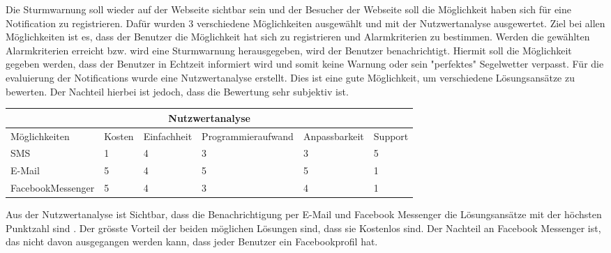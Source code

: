 Die Sturmwarnung soll wieder auf der Webseite sichtbar sein und der Besucher der Webseite soll die Möglichkeit haben sich für eine Notification zu registrieren. Dafür wurden 3 verschiedene Möglichkeiten ausgewählt und mit der Nutzwertanalyse ausgewertet. Ziel bei allen Möglichkeiten ist es, dass der Benutzer die Möglichkeit hat sich zu registrieren und Alarmkriterien zu bestimmen. Werden die gewählten Alarmkriterien erreicht bzw. wird eine Sturmwarnung herausgegeben, wird der Benutzer benachrichtigt. Hiermit soll die Möglichkeit gegeben werden, dass der Benutzer in Echtzeit informiert wird und somit keine Warnung oder sein "perfektes" Segelwetter verpasst. Für die evaluierung der Notifications wurde eine Nutzwertanalyse erstellt. Dies ist eine gute Möglichkeit, um verschiedene Lösungsansätze zu bewerten. Der Nachteil hierbei ist jedoch, dass die Bewertung sehr subjektiv ist. 

\begin{center}
\begin{tabular}{ |p{3.5cm}||p{1cm}|p{2cm}|p{3.5cm}|p{2.5cm}|p{1.5cm}|}
 \hline
 \multicolumn{6}{|c|}{Nutzwertanalyse} \\
 \hline
	Möglichkeiten & Kosten & Einfachheit & Programmieraufwand & Anpassbarkeit & Support\\
 \hline
	SMS & 1 & 4 & 3 & 3 & 5\\
	E-Mail & 5 & 4 & 5 & 5 & 1\\
	FacebookMessenger & 5 & 4 & 3 & 4 & 1\\
 
\hline
\end{tabular}
\end{center}

Aus der Nutzwertanalyse ist Sichtbar, dass die Benachrichtigung per E-Mail und Facebook Messenger die Lösungsansätze mit der höchsten Punktzahl sind . Der grösste Vorteil der beiden möglichen Lösungen sind, dass sie Kostenlos sind. Der Nachteil an Facebook Messenger ist, das nicht davon ausgegangen werden kann, dass jeder Benutzer ein Facebookprofil hat. 
